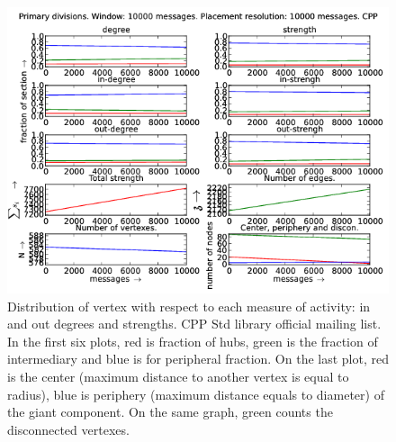 \documentclass[%
 aip,
 jmp,%
 amsmath,amssymb,
 reprint,%
]{revtex4-1}
\begin{document}
\begin{figure}[hb]
   \centering
        \includegraphics[width=\textwidth]{figs/CPP/10000}
    \caption{Distribution of vertex with respect to each measure of activity: in and out degrees and strengths. CPP Std library official mailing list. In the first six plots, red is fraction of hubs, green is the fraction of intermediary and blue is for peripheral fraction. On the last plot, red is the center (maximum distance to another vertex is equal to radius), blue is periphery (maximum distance equals to diameter) of the giant component. On the same graph, green counts the disconnected vertexes.}
    \label{fig:cpp10000}
\end{figure}
\end{document}
